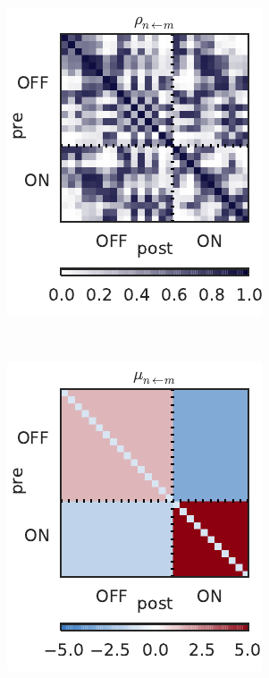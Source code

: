 \begin{figure}[t!]
\begin{subfigure}[b]{1.85in}
    \includegraphics[width=\textwidth]{figures/ch3/rgc_prob_conn.pdf}
    \label{fig:rgc_rho}
  \end{subfigure}
  ~
  \begin{subfigure}[b]{1.85in}
    \centering
    \caption{}
    \vspace{-.2in}
    \includegraphics[width=\textwidth]{figures/ch3/rgc_mean_conn.pdf}

\end{subfigure}
\end{figure}
